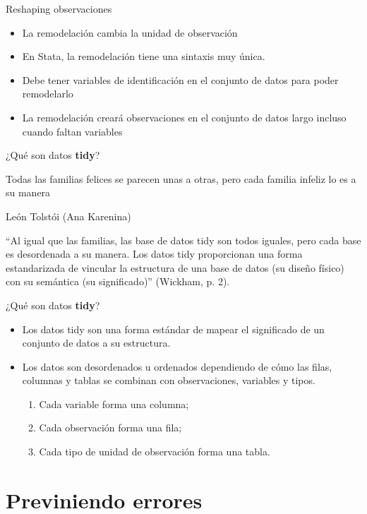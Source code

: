 \documentclass[10pt, aspectratio=169, compress]{beamer}
\begin{document}
\begin{frame}{Reshaping observaciones}
	\begin{itemize}
		\item La remodelación cambia la unidad de observación
		\item En Stata, la remodelación tiene una sintaxis muy única.
		\item Debe tener variables de identificación en el conjunto de datos para poder remodelarlo
		\item La remodelación creará observaciones en el conjunto de datos largo incluso cuando faltan variables		
	\end{itemize}
\end{frame}
\begin{frame}{¿Qué son datos \textbf{tidy}?}
	\epigraph{Todas las familias felices se parecen unas a otras, pero cada familia infeliz lo es a su manera}{León Tolstói (Ana Karenina)}

	``Al igual que las familias, las base de datos tidy son todos iguales, pero cada base es desordenada a su manera. Los datos tidy proporcionan una forma estandarizada de vincular la estructura de una base de datos (su diseño físico) con su semántica (su significado)'' (Wickham, p. 2).
\end{frame}
\begin{frame}{¿Qué son datos \textbf{tidy}?}
	\begin{itemize}
		\item Los datos tidy son una forma estándar de mapear el significado de un conjunto de datos a su estructura. 
		\item Los datos son desordenados u ordenados dependiendo de cómo las filas, columnas y tablas se combinan con observaciones, variables y tipos.
		\begin{enumerate}
			\item Cada variable forma una columna;
			\item Cada observación forma una fila; 
			\item Cada tipo de unidad de observación forma una tabla.
		\end{enumerate}
	\end{itemize}
\end{frame}
\section{Previniendo errores}
\end{document}
